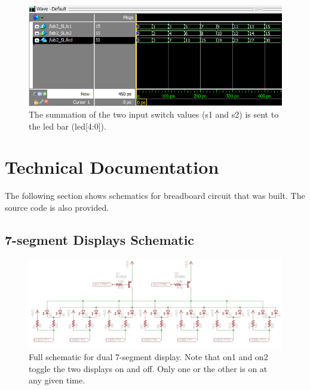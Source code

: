 \documentclass[11pt]{article}
\begin{document}
\begin{figure}[h!]
\centering
\includegraphics[scale=1]{sum.png}
\caption{The summation of the two input switch values (s1 and s2) is sent to the led bar (led[4:0]).}
\label{fig:wave_sum}
\end{figure}


\clearpage

\section{Technical Documentation}

The following section shows schematics for breadboard circuit that was built. The source code is also provided.

\subsection{7-segment Displays Schematic}

\begin{figure}[h!]
\centering
\includegraphics[scale=0.5, angle=90]{seven_segment_all.png}
\caption{Full schematic for dual 7-segment display. Note that on1 and on2 toggle the two displays on and off. Only one or the other is on at any given time.}
\label{fig:seven_seg_sch}
\end{figure} 
\end{document}
